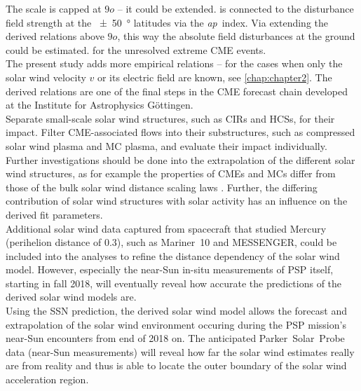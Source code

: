The \Kp{} scale is capped at $9o$ -- it could be extended. \Kp{} is connected to the disturbance field strength at the \SI{+-50}{\degree} latitudes via the \textit{ap}~index. Via extending the derived \Kp{} relations above $9o$, this way the absolute field disturbances at the ground could be estimated. for the unresolved extreme CME events.\\

The present study adds more empirical \Kp{} relations -- for the cases when only the solar wind velocity $v$ or its electric field \vBz{} are known, see \autoref{chap:chapter2}. The derived \Kp{} relations are one of the final steps in the CME forecast chain developed at the Institute for Astrophysics Göttingen.\\

Separate small-scale solar wind structures, such as CIRs and HCSs, for their \Kp{} impact. Filter CME-associated flows into their substructures, such as compressed solar wind plasma and MC plasma, and evaluate their \Kp{} impact individually.\\



Further investigations should be done into the extrapolation of the different solar wind structures, as for example the properties of CMEs and MCs differ from those of the bulk solar wind distance scaling laws \citep{Bothmer1998}. Further, the differing contribution of solar wind structures with solar activity has an influence on the derived fit parameters.\\

Additional solar wind data captured from spacecraft that studied Mercury (perihelion distance of \SI{0.3}{\au}), such as Mariner~10 and MESSENGER, could be included into the analyses to refine the distance dependency of the solar wind model.
However, especially the near-Sun in-situ measurements of PSP itself, starting in fall 2018, will eventually reveal how accurate the predictions of the derived solar wind models are.\\

Using the SSN prediction, the derived solar wind model allows the forecast and extrapolation of the solar wind environment occuring during the PSP mission's near-Sun encounters from end of 2018 on. The anticipated Parker~Solar~Probe data (near-Sun measurements) will reveal how far the solar wind estimates really are from reality and thus is able to locate the outer boundary of the solar wind acceleration region.\\

